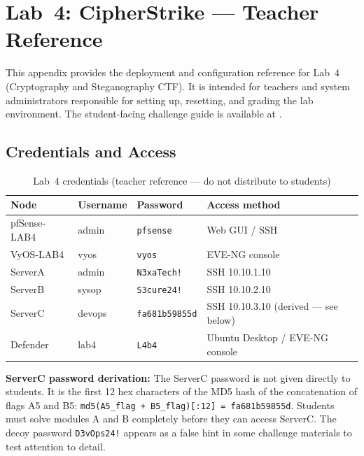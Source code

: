 
\chapter{Lab~4: CipherStrike --- Teacher Reference}
\label{app:lab4}

This appendix provides the deployment and configuration reference for Lab~4
(Cryptography and Steganography CTF). It is intended for teachers and system
administrators responsible for setting up, resetting, and grading the lab
environment. The student-facing challenge guide is available at
.

\section*{Credentials and Access}

\begin{table}[H]
\centering
\small
\begin{tabularx}{\textwidth}{lll>{\raggedright\arraybackslash}X}
\toprule
\textbf{Node} & \textbf{Username} & \textbf{Password} & \textbf{Access method} \\
\midrule
pfSense-LAB4 & admin  & \texttt{pfsense}       & Web GUI / SSH \\
VyOS-LAB4    & vyos   & \texttt{vyos}          & EVE-NG console \\
ServerA      & admin  & \texttt{N3xaTech!}     & SSH 10.10.1.10 \\
ServerB      & sysop  & \texttt{S3cure24!}     & SSH 10.10.2.10 \\
ServerC      & devops & \texttt{fa681b59855d}  & SSH 10.10.3.10 (derived --- see below) \\
Defender     & lab4   & \texttt{L4b4}          & Ubuntu Desktop / EVE-NG console \\
\bottomrule
\end{tabularx}
\caption{Lab~4 credentials (teacher reference --- do not distribute to students)}
\label{tab:lab4-creds}
\end{table}

\noindent\textbf{ServerC password derivation:} The ServerC password is not given
directly to students. It is the first 12 hex characters of the MD5 hash of the
concatenation of flags A5 and B5:
\texttt{md5(A5\_flag + B5\_flag)[:12] = fa681b59855d}.
Students must solve modules A and B completely before they can access ServerC.
The decoy password \texttt{D3vOps24!} appears as a false hint in some challenge
materials to test attention to detail.


